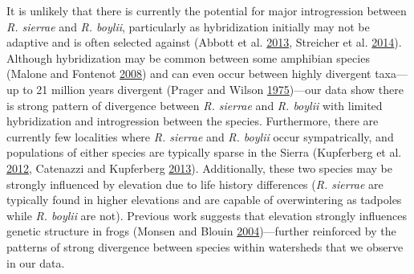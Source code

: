 \documentclass[proquest,12pt,final]{ucthesis-CA2012} %
\begin{document}
\begin{ucmainmatter}
It is unlikely that there is currently the potential for major
introgression between \emph{R. sierrae} and \emph{R. boylii},
particularly as hybridization initially may not be adaptive and is often
selected against (Abbott et al.
\protect\hyperlink{ref-abbott_hybridization_2013}{2013}, Streicher et
al. \protect\hyperlink{ref-streicher_diversification_2014}{2014}).
Although hybridization may be common between some amphibian species
(Malone and Fontenot \protect\hyperlink{ref-malone_patterns_2008}{2008})
and can even occur between highly divergent taxa---up to 21 million
years divergent (Prager and Wilson
\protect\hyperlink{ref-prager_slow_1975}{1975})---our data show there is
strong pattern of divergence between \emph{R. sierrae} and \emph{R.
boylii} with limited hybridization and introgression between the
species. Furthermore, there are currently few localities where \emph{R.
sierrae} and \emph{R. boylii} occur sympatrically, and populations of
either species are typically sparse in the Sierra (Kupferberg et al.
\protect\hyperlink{ref-kupferberg_effects_2012}{2012}, Catenazzi and
Kupferberg \protect\hyperlink{ref-catenazzi_importance_2013}{2013}).
Additionally, these two species may be strongly influenced by elevation
due to life history differences (\emph{R. sierrae} are typically found
in higher elevations and are capable of overwintering as tadpoles while
\emph{R. boylii} are not). Previous work suggests that elevation
strongly influences genetic structure in frogs (Monsen and Blouin
\protect\hyperlink{ref-monsen_extreme_2004}{2004})---further reinforced
by the patterns of strong divergence between species within watersheds
that we observe in our data.


\end{ucmainmatter}
\end{document}
